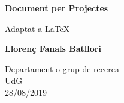 \begin{titlepage}
	\begin{center}
		\vspace*{1cm}
		
		\Huge
		\textbf{Document per Projectes}
		
		\vspace{0.5cm}
		\LARGE
		Adaptat a \LaTeX
	
		\vspace{1.5cm}
		
		\textbf{Llorenç Fanals Batllori}
		
		\vfill
		
		\small
		
		\vspace{1cm}
		
	\end{center}
	
	\begin{flushright}
	\large	
	Departament o grup de recerca\\
	UdG\\
	28/08/2019
	\end{flushright}
	


\end{titlepage}